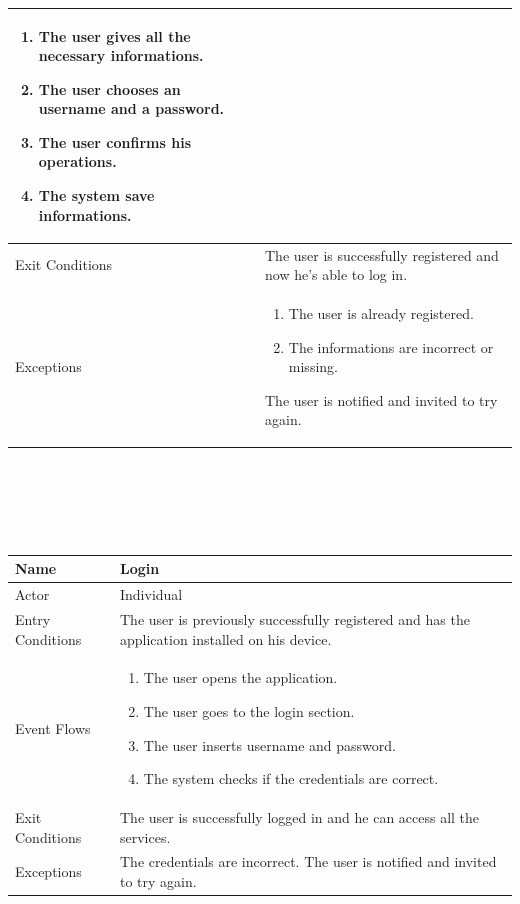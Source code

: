 \documentclass{article}
\begin{document}
\begin{legal}
\begin{legal}
\begin{legal}
\begin{tabular}{| m{3.5cm} | m{8cm}| }
\begin{enumerate}
									\item The user gives all the necessary informations.
									\item The user chooses an username and a password.
									\item The user confirms his operations.
									\item The system save informations.
				\end{enumerate}\\
				\hline
					Exit Conditions & The user is successfully  registered and now he's able to log in.\\
				\hline
					Exceptions & \begin{enumerate}
									  \item The user is already registered.
									  \item The informations are incorrect or
									   missing.
				\end{enumerate}
				The user is notified and invited to try again.\\
				\hline
				\end{tabular}\\
				\\\\\\
				\begin{tabular}{| m{3.5cm} | m{8cm}| }
				\hline
					Name & Login\\
				\hline
					Actor & Individual\\
				\hline
					Entry Conditions & The user is previously successfully registered and has the application installed
				on his device.\\
				\hline
					Event Flows & \begin{enumerate}
									  \item The user opens the application.
									  \item The user goes to the login section.
									  \item The user inserts username and password.
									  \item The system checks if the credentials are correct.
				\end{enumerate}\\
				\hline
					Exit Conditions & The user is successfully logged in and he can access all the services. \\
				\hline
					Exceptions & The credentials are incorrect. The user is notified and invited to try again.\\
				\hline

\end{tabular}
\end{legal}
\end{legal}
\end{legal}
\end{document}
